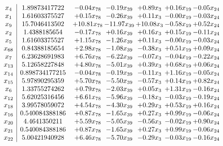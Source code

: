 \documentclass[8pt]{article}
\begin{document}
\[\begin{array}{c| c c@{\hskip 2pt} c@{\hskip 2pt} c@{\hskip 2pt} c@{\hskip 2pt} c@{\hskip 2pt} }
 x_{4}   &  1.89873417722 & -0.04 x_{78} & -0.19 x_{39} & +  0.89 x_{3} & +  0.16 x_{19} & -0.05 x_{24}\\
 x_{1}   &  1.61603375527 & +  0.15 x_{78} & -0.26 x_{39} & +  0.11 x_{3} & -0.00 x_{19} & -0.03 x_{24}\\
 x_{9}   &  15.7046413502 & + 10.81 x_{78} & -11.97 x_{39} & + 10.08 x_{3} & -0.58 x_{19} & +  0.52 x_{24}\\
 x_{2}   &  1.4388185654 & -0.17 x_{78} & +  0.16 x_{39} & +  0.16 x_{3} & +  0.15 x_{19} & -0.11 x_{24}\\
 x_{5}   &  1.61603375527 & +  1.15 x_{78} & -1.26 x_{39} & +  0.11 x_{3} & -0.00 x_{19} & -0.03 x_{24}\\
 x_{68}   &  0.84388185654 & +  2.98 x_{78} & -1.08 x_{39} & -0.38 x_{3} & +  0.51 x_{19} & +  0.09 x_{24}\\
 x_{7}   &  6.23628691983 & +  6.76 x_{78} & -6.22 x_{39} & -0.07 x_{3} & -0.04 x_{19} & -0.22 x_{24}\\
 x_{13}   &  5.12658227848 & +  4.80 x_{78} & -5.01 x_{39} & +  0.39 x_{3} & +  0.68 x_{19} & +  0.06 x_{24}\\
 x_{14}   &  0.898734177215 & -0.04 x_{78} & -0.19 x_{39} & -0.11 x_{3} & +  1.16 x_{19} & -0.05 x_{24}\\
 x_{15}   &  5.97890295359 & +  5.70 x_{78} & -5.50 x_{39} & -0.57 x_{3} & +  0.14 x_{19} & +  0.82 x_{24}\\
 x_{6}   &  1.33755274262 & +  0.79 x_{78} & -2.03 x_{39} & +  0.05 x_{3} & +  1.31 x_{19} & -0.16 x_{24}\\
 x_{12}   &  5.62025316456 & +  6.61 x_{78} & -5.96 x_{39} & -0.18 x_{3} & -0.03 x_{19} & -0.19 x_{24}\\
 x_{18}   &  3.99578059072 & +  4.54 x_{78} & -4.30 x_{39} & +  0.29 x_{3} & +  0.53 x_{19} & +  0.16 x_{24}\\
 x_{16}   &  0.540084388186 & +  0.87 x_{78} & -1.65 x_{39} & +  0.27 x_{3} & +  0.99 x_{19} & -0.06 x_{24}\\
 x_{20}   &  4.4641350211 & +  5.59 x_{78} & -5.05 x_{39} & -0.56 x_{3} & -0.02 x_{19} & +  0.90 x_{24}\\
 x_{21}   &  0.540084388186 & +  0.87 x_{78} & -1.65 x_{39} & +  0.27 x_{3} & +  0.99 x_{19} & -0.06 x_{24}\\
 x_{22}   &  5.00421940928 & +  6.46 x_{78} & -5.70 x_{39} & -0.29 x_{3} & -0.03 x_{19} & -0.16 x_{24}\\

\end{array}\]
\end{document}

